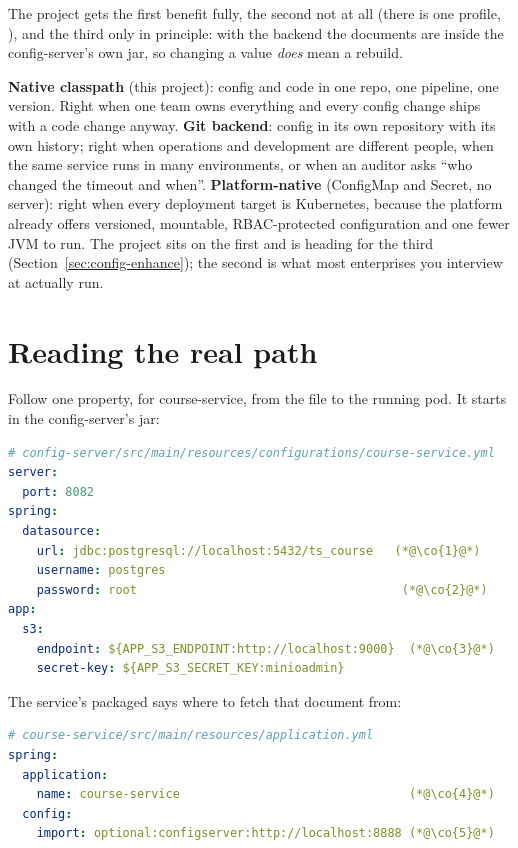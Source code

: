 The project gets the first benefit fully, the second not at all (there
is one profile, ), and the third only in principle: with
the  backend the documents are inside the config-server's
own jar, so changing a value \emph{does} mean a rebuild.

\begin{decision}
\textbf{Native classpath} (this project): config and code in one repo,
one pipeline, one version. Right when one team owns everything and every
config change ships with a code change anyway. \textbf{Git backend}:
config in its own repository with its own history; right when
operations and development are different people, when the same service
runs in many environments, or when an auditor asks ``who changed the
timeout and when''. \textbf{Platform-native} (ConfigMap and Secret, no
server): right when every deployment target is Kubernetes, because the
platform already offers versioned, mountable, RBAC-protected
configuration and one fewer JVM to run. The project sits on the first
and is heading for the third (Section~\ref{sec:config-enhance}); the
second is what most enterprises you interview at actually run.
\end{decision}

\section{Reading the real path}

Follow one property,  for course-service,
from the file to the running pod. It starts in the config-server's jar:

\begin{lstlisting}[language=yaml]
# config-server/src/main/resources/configurations/course-service.yml
server:
  port: 8082
spring:
  datasource:
    url: jdbc:postgresql://localhost:5432/ts_course   (*@\co{1}@*)
    username: postgres
    password: root                                     (*@\co{2}@*)
app:
  s3:
    endpoint: ${APP_S3_ENDPOINT:http://localhost:9000}  (*@\co{3}@*)
    secret-key: ${APP_S3_SECRET_KEY:minioadmin}
\end{lstlisting}

The service's packaged  says where to fetch that
document from:

\begin{lstlisting}[language=yaml]
# course-service/src/main/resources/application.yml
spring:
  application:
    name: course-service                                (*@\co{4}@*)
  config:
    import: optional:configserver:http://localhost:8888 (*@\co{5}@*)
\end{lstlisting}

